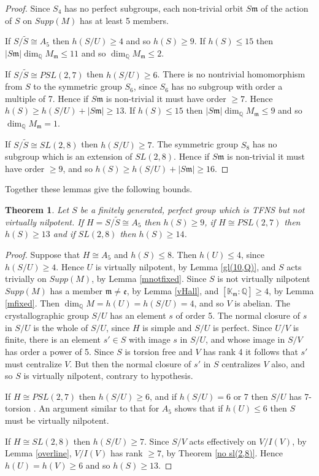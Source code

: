 \documentclass[12pt]{amsart}
\renewcommand{\geq}{\geqslant}
\renewcommand{\leq}{\leqslant}
\newtheorem{theorem}{Theorem}
\begin{document}
\begin{proof}
Since $S_4$ has no perfect subgroups,
each non-trivial orbit $S\mathfrak{m}$ of the action of $S$ on $Supp(M)$ 
has at least 5 members.

If $S/\widetilde{S}\cong{A_5}$ then $h(S/U)\geq4$ and so $h(S)\geq9$.
If $h(S)\leq15$ then $|S\mathfrak{m}|\dim_\mathbb{Q}M_\mathfrak{m}\leq11$
and so $\dim_\mathbb{Q}M_\mathfrak{m}\leq2$.

If $S/\widetilde{S}\cong{PSL(2,7)}$ then $h(S/U)\geq6$.
There is no nontrivial homomorphism from $S$ to the symmetric group $S_6$,
since $S_6$ has no subgroup with order a multiple of 7.
Hence if $S\mathfrak{m}$ is non-trivial it must have order $\geq7$.
Hence $h(S)\geq{h(S/U)}+|S\mathfrak{m}|\geq13$.
If $h(S)\leq15$ then $|S\mathfrak{m}|\dim_\mathbb{Q}M_\mathfrak{m}\leq9$
and so $\dim_\mathbb{Q}M_\mathfrak{m}=1$.

If $S/\widetilde{S}\cong{SL(2,8)}$ then $h(S/U)\geq7$.
The symmetric group $S_8$ has no subgroup which is an extension of $SL(2,8)$.
Hence if $S\mathfrak{m}$ is non-trivial it must have order $\geq9$,
and so $h(S)\geq{h(S/U)}+|S\mathfrak{m}|\geq16$.
\end{proof}

Together these lemmas give the following bounds.

\begin{theorem}
\label{vsolvthm}
Let $S$ be a finitely generated, perfect group which is TFNS but not virtually nilpotent.
If $H=S/\widetilde{S}\cong{A_5}$ then $h(S)\geq9$,
if $H\cong{PSL(2,7)}$
then $h(S)\geq13$ and if $SL(2,8)$ then $h(S)\geq14$.
\end{theorem}

\begin{proof}
Suppose that $H\cong{A_5}$ and $h(S)\leq8$.
Then $h(U)\leq4$, since $h(S/U)\geq4$.
Hence $U$ is virtually nilpotent, by Lemma \ref{gl(10,Q)},
and $S$ acts trivially on $Supp(M)$, by Lemma \ref{mnotfixed}.
Since $S$ is not virtually nilpotent $Supp(M)$ has a member
$\mathfrak{m}\not=\mathfrak{e}$, by Lemma \ref{vHall},
and $[\mathbb{K}_\mathfrak{m}:\mathbb{Q}]\geq4$, 
by Lemma \ref{mfixed}.
Then $\dim_\mathbb{Q}M=h(U)=h(S/U)=4$, and so $V$ is abelian.
The crystallographic group $S/U$ has an element $s$ of order 5.
The normal closure of $s$ in $S/U$ is the whole of $S/U$, 
since $H$ is simple and $S/U$ is perfect.
Since $U/V$ is finite,  
there is an element $s'\in{S}$ with image $s$ in $S/U$, 
and whose image in $S/V$ has order a power of 5.
Since $S$ is torsion free and $V$ has rank 4 it follows that $s'$ must centralize $V$.
But then the normal closure of $s'$ in $S$ centralizes $V$ also, 
and so $S$ is virtually nilpotent, contrary to hypothesis.

If $H\cong{PSL(2,7)}$ then $h(S/U)\geq6$,
and if $h(S/U)=6$ or 7 then $S/U$ has 7-torsion \cite{Lu23}.
An argument similar to that for $A_5$ shows that if $h(U)\leq6$ 
then $S$ must be virtually nilpotent.

If $H\cong{SL(2,8)}$ then $h(S/U)\geq7$.
Since $S/V$ acts effectively on $V/I(V)$, by Lemma \ref{overline},
$V/I(V)$ has rank $\geq7$, by Theorem \ref{no sl(2,8)}.
Hence $h(U)=h(V)\geq6$ and so $h(S)\geq13$.
\end{proof}
\end{document}
